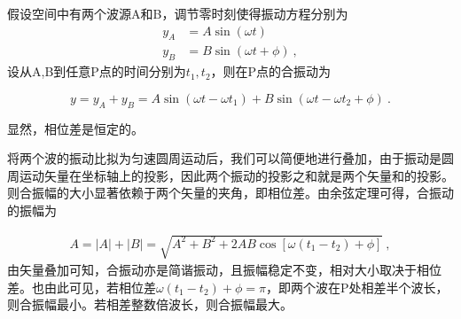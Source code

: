 假设空间中有两个波源A和B，调节零时刻使得振动方程分别为
\begin{equation}
\begin{aligned}
y_A&=A\sin(\omega t)\\
y_B&=B\sin (\omega t+\phi)~,
\end{aligned}
\end{equation}
设从A,B到任意P点的时间分别为$t_1,t_2$，则在P点的合振动为

\begin{equation}
y=y_A+y_B=A\sin(\omega t-\omega t_1)+B\sin(\omega t-\omega t_2+\phi)~.
\end{equation}

显然，相位差是恒定的。

将两个波的振动比拟为匀速圆周运动后，我们可以简便地进行叠加，由于振动是圆周运动矢量在坐标轴上的投影，因此两个振动的投影之和就是两个矢量和的投影。则合振幅的大小显著依赖于两个矢量的夹角，即相位差。由余弦定理可得，合振动的振幅为

\begin{equation}
\begin{aligned}
A=|A|+|B|=\sqrt{A^2+B^2+2AB\cos[\omega(t_1-t_2)+\phi]}~,
\end{aligned}
\end{equation}
由矢量叠加可知，合振动亦是简谐振动，且振幅稳定不变，相对大小取决于相位差。也由此可见，若相位差$\omega(t_1-t_2)+\phi=\pi$，即两个波在P处相差半个波长，则合振幅最小。若相差整数倍波长，则合振幅最大。